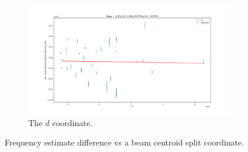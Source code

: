 \documentclass{article}
\begin{document}
\begin{figure}[!h]\ContinuedFloat
  \centering
  \begin{subfigure}[b]{\linewidth}
    \includegraphics[width=\linewidth]{img/spin_axis_motion/freq_estimates_vs_centroid_diff_D}
    \caption{The $d$ coordinate.}
  \end{subfigure}
  \caption{Frequency estimate difference vs a beam centroid split coordinate.\label{fig:BiasVsCentroid}}
\end{figure}
 







\end{document}
